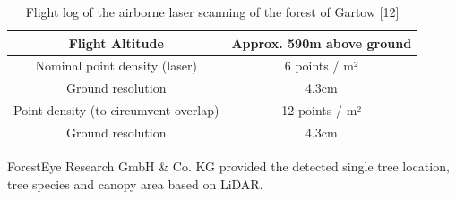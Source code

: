 \begin{table}[H]
\setlength\arrayrulewidth{1pt}  
\centering
\begin{adjustbox}{max width=\textwidth}
\begin{tabular}{|c|c|}
\hline
\rowcolor{Gray}
\textbf{Flight Altitude}              & \textbf{Approx. 590m above ground} \\ \hline
Nominal point density (laser)         & 6 points / m²                      \\ \hline
Ground resolution                     & 4.3cm                              \\ \hline
Point density (to circumvent overlap) & 12 points / m²                     \\ \hline
Ground resolution                     & 4.3cm                              \\ \hline
\end{tabular}
\end{adjustbox}
\caption{Flight log of the airborne laser scanning of the forest of Gartow [12]}
\label{tab:Flight log}
\end{table}

ForestEye Research GmbH \& Co. KG provided the detected single tree location, tree species and canopy area based on LiDAR.